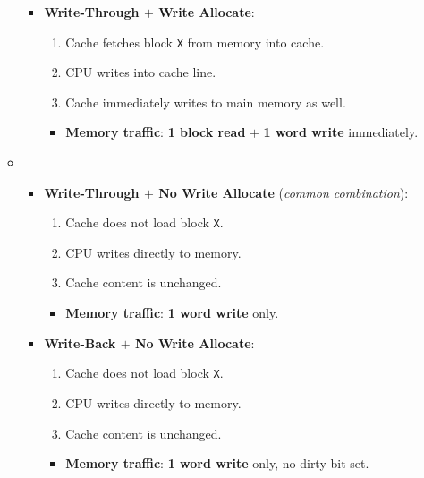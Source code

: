 \begin{enumerate}
\begin{itemize}
\begin{itemize}
            \item \textbf{Write-Through $+$ Write Allocate}:
            \begin{enumerate}
                \item Cache fetches block \texttt{X} from memory into cache.
                \item CPU writes into cache line.
                \item Cache immediately writes to main memory as well.
            \end{enumerate}
            \begin{itemize}
                \item[\textcolor{Green3}{\faIcon{traffic-light}}] \textcolor{Green3}{\textbf{Memory traffic}}: \textbf{1 block read} $+$ \textbf{1 word write} immediately.
            \end{itemize}
        \end{itemize}

        \newpage

        \item {}
        \begin{itemize}
            \item \textbf{Write-Through $+$ No Write Allocate} (\emph{common combination}):
            \begin{enumerate}
                \item Cache does not load block \texttt{X}.
                \item CPU writes directly to memory.
                \item Cache content is unchanged.
            \end{enumerate}
            \begin{itemize}
                \item[\textcolor{Green3}{\faIcon{traffic-light}}] \textcolor{Green3}{\textbf{Memory traffic}}: \textbf{1 word write} only.
            \end{itemize}

            \item \textbf{Write-Back $+$ No Write Allocate}:
            \begin{enumerate}
                \item Cache does not load block \texttt{X}.
                \item CPU writes directly to memory.
                \item Cache content is unchanged.
            \end{enumerate}
            \begin{itemize}
                \item[\textcolor{Green3}{\faIcon{traffic-light}}] \textcolor{Green3}{\textbf{Memory traffic}}: \textbf{1 word write} only, no dirty bit set.
            \end{itemize}
        \end{itemize}
    \end{itemize}
\end{enumerate}
